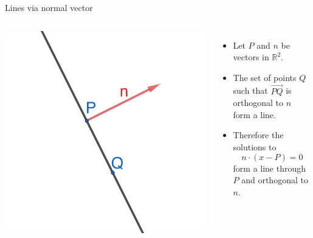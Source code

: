 \documentclass{beamer}
\begin{document}
\begin{frame}{Lines via normal vector}
\begin{columns}
    \hspace{-1cm}
\includegraphics{2d-normal.png}
\begin{itemize}
\item Let $P$ and $n$ be vectors in $\mathbb{R}^2$.
\item The set of points $Q$ such that $\overrightarrow{PQ}$ is orthogonal to $n$ form a line.
\item Therefore the solutions to \begin{equation*}
    n\cdot(x-P) = 0
\end{equation*}
form a line through $P$ and orthogonal to $n$.
\end{itemize}
\end{columns}
\end{frame}
\end{document}
